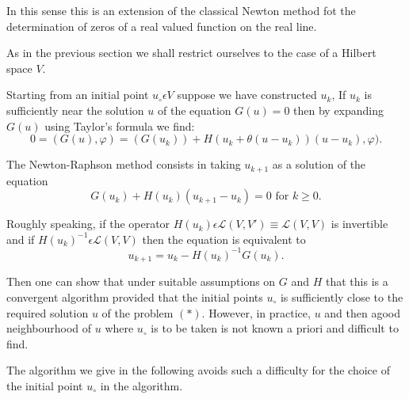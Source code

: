 In this sense this is an extension of the classical Newton method fot the determination of zeros of a real valued function on the real line.

As in the previous section we shall restrict ourselves to the case of a Hilbert space $V$.

Starting from an initial point $u_{\circ} \epsilon V$ suppose we have constructed $u_{k}$, If $u_{k}$ is sufficiently near the solution $u$ of the equation $G(u) = 0$ then by expanding $G(u)$ using Taylor's formula we find:
$$
0 = (G(u), \varphi) = (G(u_{k})) + H(u_{k} + \theta(u-u_{k})) (u-u_{k}), \varphi).
$$

The Newton-Raphson method consists in taking $u_{k+1}$ as a solution of the equation 
$$
G(u_{k})+ H(u_{k})(u_{k+1} - u_{k}) = 0 \text{ for } k \geq 0.
$$
 
Roughly speaking, if the operator $H(u_{k}) \epsilon \mathscr{L} (V, V') \equiv \mathscr{L}(V, V)$ is invertible and if $H(u_{k})^{-1} \epsilon \mathscr{L} (V, V)$ then the equation is equivalent to
$$
u_{k+1} = u_{k} - H(u_{k})^{-1} G(u_{k}).
$$

Then one can show that under suitable assumptions on $G$ and $H$ that this is a convergent algorithm provided that the initial points $u_{\circ}$ is sufficiently close to the required solution $u$ of the problem $( * )$. However, in practice, $u$ and then a\pageoriginale good neighbourhood of $u$ where $u_{\circ}$ is to be taken is not known a priori and difficult to find.

The algorithm we give in the following avoids such a difficulty for the choice of the initial point $u_{\circ}$ in the algorithm.

